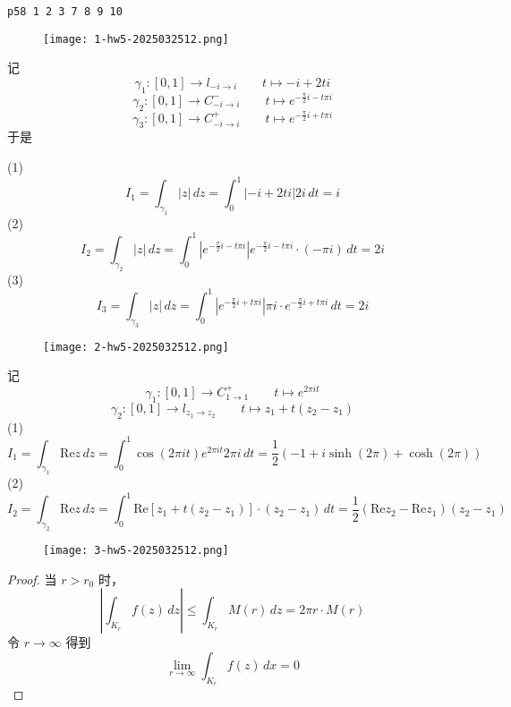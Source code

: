 \begin{lstlisting}
p58 1 2 3 7 8 9 10
\end{lstlisting}
\begin{exercise}
\begin{figure}[H]
\centering
\texttt{[image: 1-hw5-2025032512.png]}
\label{}
\end{figure}
\end{exercise}
记
\[
\gamma_1:[0,1]\to l_{-i\to i}\qquad t\mapsto-i+2ti
\]
\[
\gamma_2:[0,1]\to C^{-}_{-i\to i}\qquad t\mapsto e^{ -\frac{\pi}{2}i-t\pi i }
\]
\[
\gamma_3:[0,1]\to C^{+}_{-i\to i}\qquad t\mapsto e^{ -\frac{\pi}{2}i+t\pi i }
\]
于是

(1)
\[
I_1=\int_{\gamma_1}^{} \lvert z \rvert  \, dz =\int_{0}^{1} \lvert -i+2ti \rvert 2i  \, dt=i
\]
(2)
\[
I_2=\int_{\gamma_2}^{} \lvert z \rvert  \, dz =\int_{0}^{1} \left\lvert  e^{ -\frac{\pi}{2}i-t\pi i }  \right\rvert e^{ -\frac{\pi}{2}i-t\pi i }\cdot (-\pi i)  \, dt=2i
\]
(3)
\[
I_3=\int_{\gamma_3}^{} \lvert z \rvert  \, dz =\int_{0}^{1} \left\lvert  e^{ -\frac{\pi}{2}i+t\pi i }  \right\rvert \pi i \cdot e^{ -\frac{\pi}{2}i+t\pi i } \, dt=2i
\]
\begin{exercise}
\begin{figure}[H]
\centering
\texttt{[image: 2-hw5-2025032512.png]}
\label{}
\end{figure}
\end{exercise}
记
\[
\gamma_1:[0,1]\to C^{+}_{1\to1}\qquad t\mapsto e^{ 2\pi it }
\]
\[
\gamma_2:[0,1]\to l_{z_1\to z_2}\qquad t\mapsto z_1+t(z_2-z_1)
\]
(1)
\[
I_1=\int_{\gamma_1}^{} \mathrm{Re} z \, dz=\int_{0}^{1} \cos(2\pi i t) e^{ 2\pi i t  }2\pi i\, dt=\frac{1}{2} (-1+i \sinh (2 \pi )+\cosh (2 \pi ))
\]
(2)
\[
I_2=\int_{\gamma_2}^{} \mathrm{Re}z \, dz=\int_{0}^{1} \mathrm{Re}[z_1+t(z_2-z_1)]\cdot(z_2-z_1) \, dt =\frac{1}{2}(\mathrm{Re}z_2-\mathrm{Re}z_1)(z_2-z_1)
\]
\begin{exercise}
\begin{figure}[H]
\centering
\texttt{[image: 3-hw5-2025032512.png]}
\label{}
\end{figure}
\end{exercise}
\begin{proof}
当 $r>r_0$ 时，
\[
\left\lvert  \int_{K_{r}}^{} f(z) \, dz  \right\rvert \leq \int_{K_{r}}^{} M(r) \, dz =2\pi r \cdot M(r)
\]
令 $r \to \infty$ 得到
\[
\lim_{ r \to \infty } \int_{K_{r}}^{} f(z) \, dx =0
\]
\end{proof}

